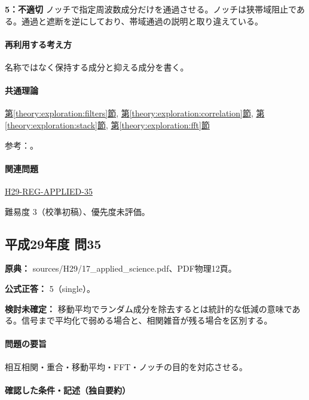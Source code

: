 \noindent\textbf{5：不適切} ノッチで指定周波数成分だけを通過させる。ノッチは狭帯域阻止である。通過と遮断を逆にしており、帯域通過の説明と取り違えている。\par

\paragraph{再利用する考え方} 名称ではなく保持する成分と抑える成分を書く。

\paragraph{共通理論} \hyperref[theory:exploration:filters]{第\ref*{theory:exploration:filters}節}, \hyperref[theory:exploration:correlation]{第\ref*{theory:exploration:correlation}節}, \hyperref[theory:exploration:stack]{第\ref*{theory:exploration:stack}節}, \hyperref[theory:exploration:fft]{第\ref*{theory:exploration:fft}節}

\par 参考：\cite{mit_signals2010,mit_moving2012,scipy_notch,scipy_fft,usgs_processing2000}。

\paragraph{関連問題} \hyperref[q:h29-reg-applied-35]{H29-REG-APPLIED-35}

\par 難易度 3（校準初稿）、優先度未評価。

\subsection{平成29年度 問35}
\label{q:h29-reg-applied-35}

\noindent\textbf{原典：} sources/H29/17\_applied\_science.pdf、PDF物理12頁。

\textbf{公式正答：} 5（single）。

\par\textbf{検討未確定：} 移動平均でランダム成分を除去するとは統計的な低減の意味である。信号まで平均化で弱める場合と、相関雑音が残る場合を区別する。

\paragraph{問題の要旨} 相互相関・重合・移動平均・FFT・ノッチの目的を対応させる。

\paragraph{確認した条件・記述（独自要約）}\mbox{}\par

